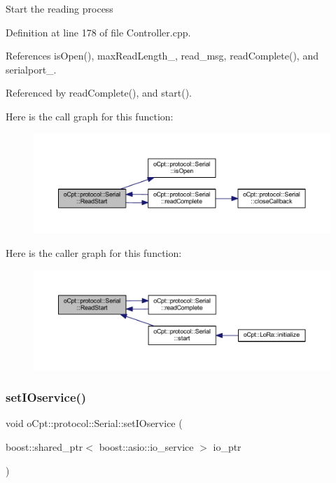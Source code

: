 Start the reading process 

Definition at line 178 of file Controller.\+cpp.



References is\+Open(), max\+Read\+Length\+\_\+, read\+\_\+msg, read\+Complete(), and serialport\+\_\+.



Referenced by read\+Complete(), and start().

Here is the call graph for this function\+:\nopagebreak
\begin{figure}[H]
\begin{center}
\leavevmode
\includegraphics[width=350pt]{classo_cpt_1_1protocol_1_1_serial_a5bf4aa913654c4ebef3c48ec54cf8b03_cgraph}
\end{center}
\end{figure}
Here is the caller graph for this function\+:\nopagebreak
\begin{figure}[H]
\begin{center}
\leavevmode
\includegraphics[width=350pt]{classo_cpt_1_1protocol_1_1_serial_a5bf4aa913654c4ebef3c48ec54cf8b03_icgraph}
\end{center}
\end{figure}
\hypertarget{classo_cpt_1_1protocol_1_1_serial_abddd54f13b696af1ca6ac0f97950708b}{}\label{classo_cpt_1_1protocol_1_1_serial_abddd54f13b696af1ca6ac0f97950708b} 
\subsubsection{\texorpdfstring{set\+I\+Oservice()}{setIOservice()}}
{\footnotesize\ttfamily void o\+Cpt\+::protocol\+::\+Serial\+::set\+I\+Oservice (\begin{DoxyParamCaption}\item[{boost\+::shared\+\_\+ptr$<$ boost\+::asio\+::io\+\_\+service $>$}]{io\+\_\+ptr }\end{DoxyParamCaption})}

